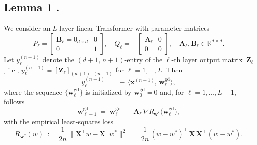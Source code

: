 \subsection{Lemma 1 \cite{ahn2024transformers}.}
We consider an $L$-layer linear Transformer with parameter matrices 
\[
P_\ell = 
\begin{bmatrix}
\mathbf{B}_\ell = 0_{d \times d} & 0 \\
0 & 1
\end{bmatrix},
\quad
Q_\ell = 
-\begin{bmatrix}
\mathbf{A}_\ell & 0 \\
0 & 0
\end{bmatrix}, 
\quad \mathbf{A}_\ell, \mathbf{B}_\ell \in \mathbb{R}^{d \times d}.
\]
Let $y_\ell^{(n+1)}$ denote the $(d+1,\,n+1)$-entry of the $\ell$-th layer output matrix~$\mathbf{Z}_\ell$, i.e., 
\(
   y_\ell^{(n+1)} = [\mathbf{Z}_\ell]_{(d+1),\,(n+1)}
\)
for $\ell = 1, \dots, L$. Then
\[
   y_\ell^{(n+1)} \;=\; -\,\bigl\langle \mathbf{x}^{(n+1)}, \,\mathbf{w}_\ell^{\mathrm{gd}}\bigr\rangle,
\]
where the sequence $\{\mathbf{w}_\ell^{\mathrm{gd}}\}$ is initialized by $\mathbf{w}_{0}^{\mathrm{gd}} = 0$ and, for $\ell = 1, \dots, L - 1,$ follows
\[
   \mathbf{w}_{\ell+1}^{\mathrm{gd}}
   \;=\;
   \mathbf{w}_{\ell}^{\mathrm{gd}}
   \;-\;
   \mathbf{A}_\ell 
   \,\nabla R_{\mathbf{w}^*}\bigl(\mathbf{w}_{\ell}^{\mathrm{gd}}\bigr),
\]
with the empirical least-squares loss 
\[
   R_{\mathbf{w}^*}(w) 
   \;:=\; 
   \frac{1}{2n}\,\bigl\|\mathbf{X}^\top w - \mathbf{X}^\top w^*\bigr\|^2
   \;=\;
   \frac{1}{2n}\,
   (w - w^*)^\top \,\mathbf{X}\,\mathbf{X}^\top \,(w - w^*).
\]
